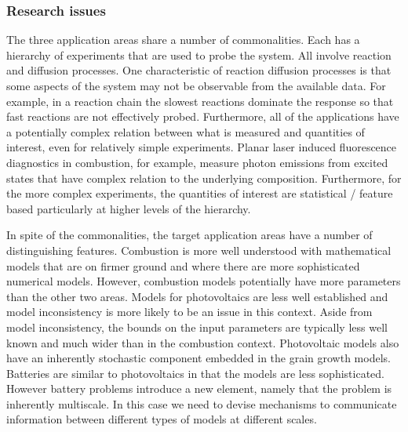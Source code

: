\documentclass[11pt]{article}
\begin{document}
\subsubsection*{Research issues}
The three application areas share a number of commonalities.
Each has a hierarchy of experiments that are used to probe the system.
All involve reaction and diffusion processes.
One characteristic of reaction diffusion processes is that some aspects of the system
may not be observable from the available data. For example, in a reaction chain the slowest
reactions dominate the response so that fast reactions are not effectively probed.
Furthermore, all of the applications
have a potentially complex relation between what is measured and quantities of interest,
even for relatively simple experiments. 
Planar laser induced fluorescence diagnostics in combustion, for example, 
measure photon emissions from excited states that have complex relation to the underlying
composition.
Furthermore, for the more complex experiments, the
quantities of interest are statistical / feature based
particularly at higher levels of the hierarchy.

In spite of the commonalities, the target application areas have a number
of distinguishing features.
Combustion is more well understood with mathematical models that are on firmer ground
and where there are more sophisticated numerical models.
However, combustion models potentially have more parameters than the other two areas.
Models for photovoltaics are less well established and
model inconsistency is more likely to be an issue in this context.
Aside from model inconsistency, the bounds on the input parameters are typically less well known and much wider than in the combustion context. 
Photovoltaic models also have an inherently stochastic component
embedded in  the grain growth models.  
Batteries are similar to photovoltaics
in that the models are less sophisticated. However battery problems introduce a 
new element, namely that the problem is inherently multiscale.
In this case we need to devise mechanisms to communicate information
between different types of models at different scales.
\end{document}
